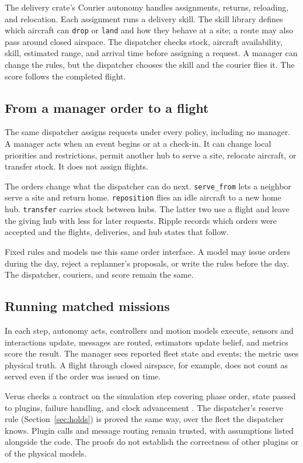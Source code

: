 \documentclass[letterpaper,10pt,conference]{ieeeconf}
\begin{document}
The delivery crate's Courier autonomy handles assignments, returns,
reloading, and relocation. Each assignment runs a delivery skill. The
skill library defines which aircraft can \texttt{drop} or \texttt{land}
and how they behave at a site; a route may also pass around closed airspace.
The dispatcher checks stock, aircraft availability, skill, estimated range,
and arrival time before assigning a request. A manager can change the rules,
but the dispatcher chooses the skill and the courier flies it. The score
follows the completed flight.

\subsection{From a manager order to a flight}

The same dispatcher assigns requests under every policy, including no
manager. A manager acts when an event begins or at a check-in. It can
change local priorities and restrictions, permit another hub to serve a
site, relocate aircraft, or transfer stock. It does not assign flights.

The orders change what the dispatcher can do next. \texttt{serve\_from}
lets a neighbor serve a site and return home. \texttt{reposition} flies
an idle aircraft to a new home hub. \texttt{transfer} carries stock between
hubs. The latter two use a flight and leave the giving hub with less for
later requests. Ripple records which orders were accepted and the flights,
deliveries, and hub states that follow.

Fixed rules and models use this same order interface. A model may issue
orders during the day, reject a replanner's proposals, or write the rules
before the day. The dispatcher, couriers, and score remain the same.

\subsection{Running matched missions}

In each step, autonomy acts, controllers and motion models execute,
sensors and interactions update, messages are routed, estimators update
belief, and metrics score the result. The manager sees reported fleet
state and events; the metric uses physical truth. A flight through closed
airspace, for example, does not count as served even if the order was
issued on time.

Verus checks a contract on the simulation step covering phase order,
state passed to plugins, failure handling, and clock advancement
\cite{lattuada2023verus}. The dispatcher's reserve rule
(Section~\ref{sec:holds}) is proved the same way, over the fleet the
dispatcher knows. Plugin calls and message routing remain trusted, with
assumptions listed alongside the code. The proofs do not establish the
correctness of other plugins or of the physical models.
\end{document}
